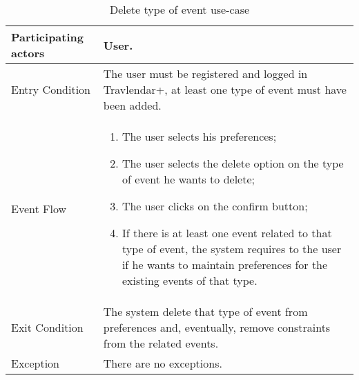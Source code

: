 \begin{table}[H]
	\begin{center}
		\begin{tabular}{ | p{} | p{} | }
		\hline
		Participating actors &  User.\\
		\hline
		Entry Condition & The user must be registered and logged in Travlendar+, at least one type of event must have been added.\\
		\hline
		Event Flow & 
			\begin{enumerate}
				\item The user selects his preferences;
				\item The user selects the delete option on the type of event he wants to delete;
				\item The user clicks on the confirm button;
				\item If there is at least one event related to that type of event, the system requires to the user if he wants to maintain preferences for the existing events of that type. 
			\end{enumerate} \\
		\hline
		Exit Condition & The system delete that type of event from preferences and, eventually, remove constraints from the related events. \\
		\hline
		Exception & There are no exceptions.\\ 
		\hline
		\end{tabular}
	\end{center}
	\caption{Delete type of event use-case}
\end{table}